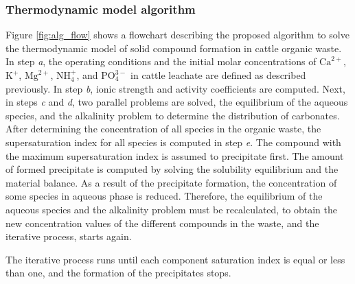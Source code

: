\documentclass[10pt,a4paper]{article}
\begin{document}
\subsubsection{Thermodynamic model algorithm}
Figure \ref{fig:alg_flow} shows a flowchart describing the proposed algorithm to solve the thermodynamic model of solid compound formation in cattle organic waste. In step \textit{a}, the operating conditions and the initial molar concentrations of $\text{Ca}^{2+}$, $\text{K}^{+}$, $\text{Mg}^{2+}$, $\text{NH}_{4}^{+}$, and $\text{PO}_{4}^{3-}$ in cattle leachate are defined as described previously. In step \emph{b}, ionic strength and activity coefficients are computed. Next, in steps \emph{c} and \emph{d}, two parallel problems are solved, the equilibrium of the aqueous species, and the alkalinity problem to determine the distribution of carbonates. After determining the concentration of all species in the organic waste, the supersaturation index for all species is computed in step \emph{e}. The compound with the maximum supersaturation index is assumed to precipitate first. The amount of formed precipitate is computed by solving the solubility equilibrium and the material balance. As a result of the precipitate formation, the concentration of some species in aqueous phase is reduced. Therefore, the equilibrium of the aqueous species and the alkalinity problem must be recalculated, to obtain the new concentration  values of the different compounds in the waste, and the iterative process, starts again.

The iterative process runs  until each component saturation index is equal or less than one, and the formation of the precipitates stops.
\end{document}

